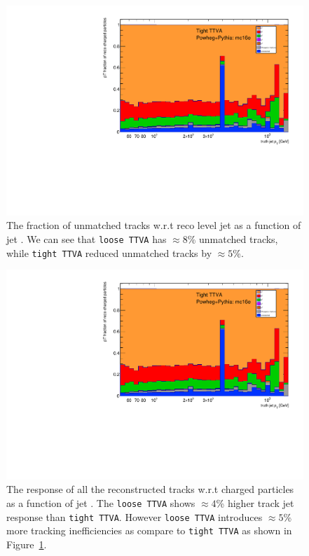 \begin{figure}[b]
\centering
\includegraphics[scale=0.3, page=16]{figures/jet_comp_study_powheg_Tight_pTFraction_mc16e.pdf}
\caption {The fraction of unmatched tracks w.r.t reco level jet as a function of jet \pT. We can see that \texttt{loose TTVA} has $\approx 8$\% unmatched tracks, while \texttt{tight TTVA} reduced unmatched tracks by $\approx 5$\%.}
\label{fig:frac_unmatchedtracks}
\end{figure}

\begin{figure}[b]
\centering
\includegraphics[scale=0.3, page=17]{figures/jet_comp_study_powheg_Tight_pTFraction_mc16e.pdf}
\caption {The response of  all the reconstructed tracks w.r.t charged particles as a function of jet \pT. The \texttt{loose TTVA} shows $\approx 4$\% higher track jet response than \texttt{tight TTVA}. However \texttt{loose TTVA} introduces $\approx 5$\% more tracking inefficiencies as compare to \texttt{tight TTVA} as shown in Figure~\ref{fig:frac_unmatchedtracks}.}
\label{fig:r_trackjet}
\end{figure}

